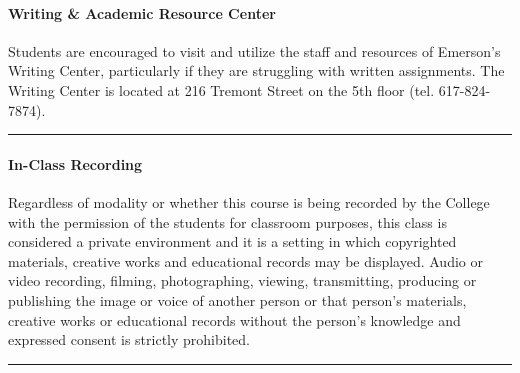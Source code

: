 \documentclass[
  letterpaper,
  DIV=11,
  numbers=noendperiod]{scrartcl}
\let\oldparagraph\paragraph
\renewcommand{\paragraph}[1]{\oldparagraph{#1}\mbox{}}
\begin{document}
\hypertarget{writing-academic-resource-center}{%
\paragraph{Writing \& Academic Resource
Center}\label{writing-academic-resource-center}}

Students are encouraged to visit and utilize the staff and resources of
Emerson's Writing Center, particularly if they are struggling with
written assignments. The Writing Center is located at 216 Tremont Street
on the 5th floor (tel. 617-824-7874).

\begin{center}\rule{0.5\linewidth}{0.5pt}\end{center}

\hypertarget{in-class-recording}{%
\paragraph{In-Class Recording}\label{in-class-recording}}

Regardless of modality or whether this course is being recorded by the
College with the permission of the students for classroom purposes, this
class is considered a private environment and it is a setting in which
copyrighted materials, creative works and educational records may be
displayed. Audio or video recording, filming, photographing, viewing,
transmitting, producing or publishing the image or voice of another
person or that person's materials, creative works or educational records
without the person's knowledge and expressed consent is strictly
prohibited.~

\begin{center}\rule{0.5\linewidth}{0.5pt}\end{center}
\end{document}
